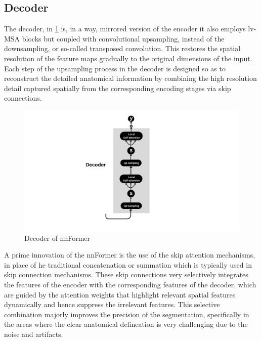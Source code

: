 \subsection{Decoder}
The decoder, in \cref{Fig:decoder} is, in a way, mirrored version of the encoder it also employs \gls{lv}-MSA blocks but coupled with convolutional upsampling, instead of the downsampling, or so-called transposed convolution. This restores the spatial resolution of the feature maps gradually to the original dimensions of the input. Each step of the upsampling process in the decoder is designed so as to reconstruct the detailed anatomical information by combining the high resolution detail captured spatially from the corresponding encoding stages via skip connections. 

\begin{figure}[htb!] %
\centering
\centering
\includegraphics[width=1\textwidth]{images/Decoder.png}
\caption{\centering Decoder of nnFormer}
\label{Fig:decoder}
\end{figure}

A prime innovation of the nnFormer is the use of the skip attention mechanisms, in place of he traditional concatenation or summation which is typically used in skip connection mechanisms. These skip connections very selectively integrates the features of the encoder with the corresponding features of the decoder, which are guided by the attention weights that highlight relevant spatial features dynamically and hence suppress the irrelevant features. This selective combination majorly improves the precision of the segmentation, specifically in the areas where the clear anatomical delineation is very challenging due to the noise and artifacts.

